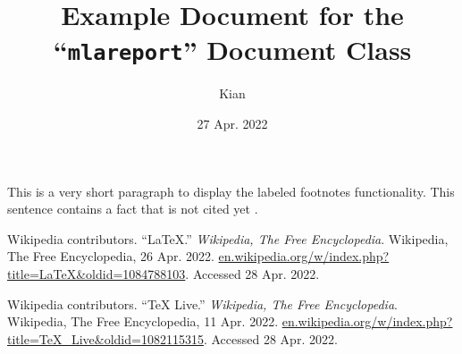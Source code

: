 \documentclass{mlareport}
\title{Example Document for the ``\texttt{mlareport}'' Document Class}
\author{Kian}{Kasad}
\date{27 Apr. 2022}
\begin{document}
\makeheading
\maketitle

\lipsum[1-3]


This is a very short paragraph to display the labeled footnotes
functionality. This sentence contains a fact that is not
cited yet \needcite.

\lipsum[4-7]

\begin{workscited}

\wcentry
	Wikipedia contributors.
	``LaTeX.''
	\textit{Wikipedia, The Free Encyclopedia}.
	Wikipedia, The Free Encyclopedia,
	26 Apr. 2022.
	\url{en.wikipedia.org/w/index.php?title=LaTeX&oldid=1084788103}.
	Accessed 28 Apr. 2022.

\wcentry
	Wikipedia contributors.
	``TeX Live.''
	\textit{Wikipedia, The Free Encyclopedia}.
	Wikipedia, The Free Encyclopedia,
	11 Apr. 2022.
	\url{en.wikipedia.org/w/index.php?title=TeX_Live&oldid=1082115315}.
	Accessed 28 Apr. 2022.

\end{workscited}
\end{document}
